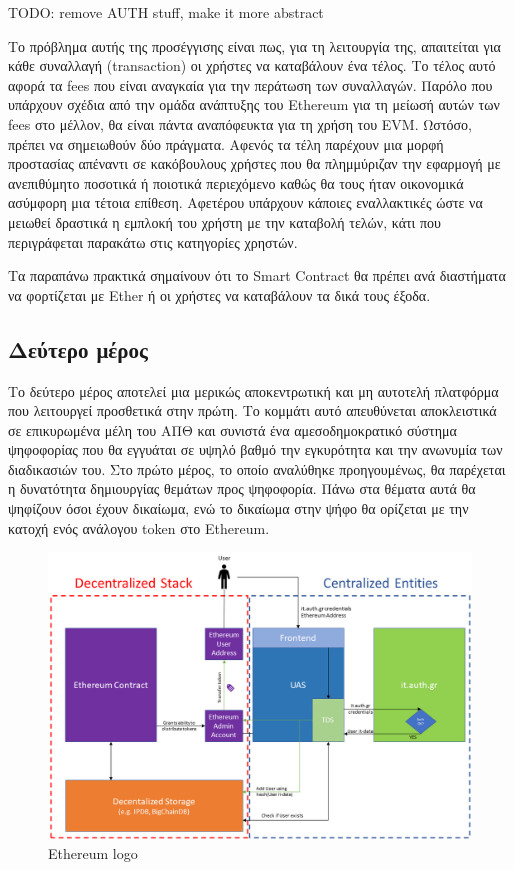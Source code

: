 TODO: remove AUTH stuff, make it more abstract

Το πρόβλημα αυτής της προσέγγισης είναι πως, για τη λειτουργία της, απαιτείται για κάθε συναλλαγή (transaction) οι
χρήστες να καταβάλουν ένα τέλος. Το τέλος αυτό αφορά τα fees που είναι αναγκαία για την περάτωση των συναλλαγών. Παρόλο
που υπάρχουν σχέδια από την ομάδα ανάπτυξης του Ethereum για τη μείωσή αυτών των fees στο μέλλον, θα είναι πάντα
αναπόφευκτα για τη χρήση του EVM. Ωστόσο, πρέπει να σημειωθούν δύο πράγματα. Αφενός τα τέλη παρέχουν μια μορφή
προστασίας απέναντι σε κακόβουλους χρήστες που θα πλημμύριζαν την εφαρμογή με ανεπιθύμητο ποσοτικά ή ποιοτικά
περιεχόμενο καθώς θα τους ήταν οικονομικά ασύμφορη μια τέτοια επίθεση. Αφετέρου υπάρχουν κάποιες εναλλακτικές ώστε να
μειωθεί δραστικά η εμπλοκή του χρήστη με την καταβολή τελών, κάτι που περιγράφεται παρακάτω στις κατηγορίες χρηστών.

Τα παραπάνω πρακτικά σημαίνουν ότι το Smart Contract θα πρέπει ανά διαστήματα να φορτίζεται με Ether ή οι χρήστες να
καταβάλουν τα δικά τους έξοδα.

\subsection{Δεύτερο μέρος} \label{subsection:3-2-first-part}

Το δεύτερο μέρος αποτελεί μια μερικώς αποκεντρωτική και μη αυτοτελή πλατφόρμα που λειτουργεί προσθετικά στην πρώτη. Το
κομμάτι αυτό απευθύνεται αποκλειστικά σε επικυρωμένα μέλη του ΑΠΘ και συνιστά ένα αμεσοδημοκρατικό σύστημα ψηφοφορίας
που θα εγγυάται σε υψηλό βαθμό την εγκυρότητα και την ανωνυμία των διαδικασιών του. Στο πρώτο μέρος, το οποίο αναλύθηκε
προηγουμένως, θα παρέχεται η δυνατότητα δημιουργίας θεμάτων προς ψηφοφορία. Πάνω στα θέματα αυτά θα ψηφίζουν όσοι έχουν
δικαίωμα, ενώ το δικαίωμα στην ψήφο θα ορίζεται με την κατοχή ενός ανάλογου token στο Ethereum.

\begin{figure}[H]
    \centering
    \includegraphics[width=\textwidth]{assets/figures/chapter-3/uas}
    \caption{Ethereum logo}
\end{figure}

